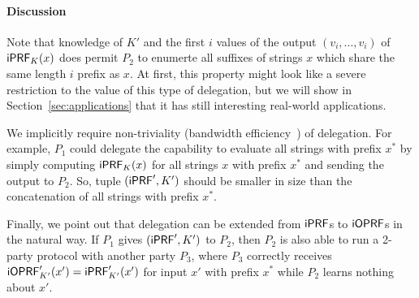 \paragraph{Discussion}

Note that knowledge of $K'$ and the first $i$ values of the output
$(v_i,\ldots,v_i)$ of $\mathsf{i}\mathsf{PRF}_K(x)$ does permit $P_2$ to enumerte all
suffixes of strings $x$ which share the same length $i$ prefix as
$x$. At first, this property might look like a severe restriction to
the value of this type of delegation, but we will show in
Section~\ref{sec:applications} that it has still interesting
real-world applications.

We implicitly require non-triviality (bandwidth
efficiency~\cite{delegate}) of delegation. For example, $P_1$ could
delegate the capability to evaluate all strings with prefix $x^*$ by
simply computing $\mathsf{i}\mathsf{PRF}_K(x)$ for all strings $x$ with prefix $x^*$
and sending the output to $P_2$. So, tuple $(\mathsf{i}\mathsf{PRF}',K')$ should be
smaller in size than the concatenation of all strings with prefix
$x^*$.

Finally, we point out that delegation can be extended from $\mathsf{i}\mathsf{PRF}$s to
$\mathsf{i}\mathsf{OPRF}$s in the natural way. If $P_1$ gives $(\mathsf{i}\mathsf{PRF}',K')$ to $P_2$,
then $P_2$ is also able to run a 2-party protocol with another party
$P_3$, where $P_3$ correctly receives
$\mathsf{i}\mathsf{OPRF}'_{K'}(x')=\mathsf{i}\mathsf{PRF}'_{K'}(x')$ for input $x'$ with prefix $x^*$
while $P_2$ learns nothing about $x'$.


